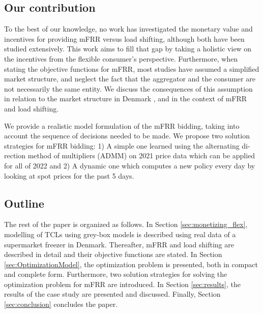\subsection{Our contribution}

To the best of our knowledge, no work has investigated the monetary value and incentives for providing mFRR versus load shifting, although both have been studied extensively. This work aims to fill that gap by taking a holistic view on the incentives from the flexible consumer's perspective. Furthermore, when stating the objective functions for mFRR, most studies have assumed a simplified market structure, and neglect the fact that the aggregator and the consumer are not necessarily the same entity. We discuss the consequences of this assumption in relation to the market structure in Denmark \cite{gade2022ecosystem}, and in the context of mFRR and load shifting. 

We provide a realistic model formulation of the mFRR bidding, taking into account the sequence of decisions needed to be made. We propose two solution strategies for mFRR bidding: 1) A simple one learned using the alternating di- rection method of multipliers (ADMM) on 2021 price data which can be applied for all of 2022 and 2) A dynamic one which computes a new policy every day by looking at spot prices for the past 5 days.

\subsection{Outline}

The rest of the paper is organized as follows. In Section \ref{sec:monetizing_flex}, modelling of TCLs using grey-box models is described using real data of a supermarket freezer in Denmark. Thereafter, mFRR and load shifting are described in detail and their objective functions are stated. In Section \ref{sec:OptimizationModel}, the optimization problem is presented, both in compact and complete form. Furthermore, two solution strategies for solving the optimization problem for mFRR are introduced. In Section \ref{sec:results}, the results of the case study are presented and discussed. Finally, Section \ref{sec:conclusion} concludes the paper.